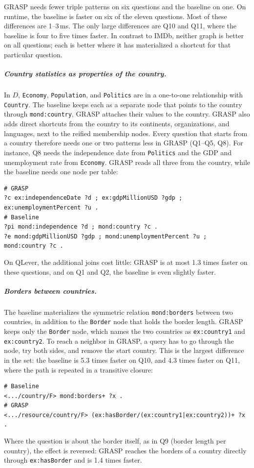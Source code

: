GRASP needs fewer triple patterns on six questions and the baseline on one. On runtime, the baseline is faster on six of the eleven questions. Most of these differences are 1--3\,ms. The only large differences are Q10 and Q11, where the baseline is four to five times faster. In contrast to IMDb, neither graph is better on all questions; each is better where it has materialized a shortcut for that particular question.
\subparagraph{Country statistics as properties of the country.}
In \(D\), \texttt{Economy}, \texttt{Population}, and \texttt{Politics} are in a one-to-one relationship with \texttt{Country}. The baseline keeps each as a separate node that points to the country through \texttt{mond:country}, GRASP attaches their values to the country. GRASP also adds direct shortcuts from the country to its continents, organizations, and languages, next to the reified membership nodes. Every question that starts from a country therefore needs one or two patterns less in GRASP (Q1--Q5, Q8). For instance, Q8 needs the independence date from \texttt{Politics} and the GDP and unemployment rate from \texttt{Economy}. GRASP reads all three from the country, while the baseline needs one node per table:
\begin{lstlisting}[language=SPARQL, basicstyle=\ttfamily\scriptsize, columns=fixed]
# GRASP
?c ex:independenceDate ?d ; ex:gdpMillionUSD ?gdp ; ex:unemploymentPercent ?u .
# Baseline
?pi mond:independence ?d ; mond:country ?c .
?e mond:gdpMillionUSD ?gdp ; mond:unemploymentPercent ?u ; mond:country ?c .
\end{lstlisting}
On QLever, the additional joins cost little: GRASP is at most 1.3 times faster on these questions, and on Q1 and Q2, the baseline is even slightly faster.

\subparagraph{Borders between countries.}
The baseline materializes the symmetric relation \texttt{mond:borders} between two countries, in addition to the \texttt{Border} node that holds the border length. GRASP keeps only the \texttt{Border} node, which names the two countries as \texttt{ex:country1} and \texttt{ex:country2}. To reach a neighbor in GRASP, a query has to go through the node, try both sides, and remove the start country. This is the largest difference in the set: the baseline is 5.3 times faster on Q10, and 4.3 times faster on Q11, where the path is repeated in a transitive closure:
\begin{lstlisting}[language=SPARQL, basicstyle=\ttfamily\scriptsize, columns=fixed]
# Baseline
<.../country/F> mond:borders+ ?x .
# GRASP
<.../resource/country/F> (ex:hasBorder/(ex:country1|ex:country2))+ ?x .
\end{lstlisting}
Where the question is about the border itself, as in Q9 (border length per country), the effect is reversed: GRASP reaches the borders of a country directly through \texttt{ex:hasBorder} and is 1.4 times faster.

